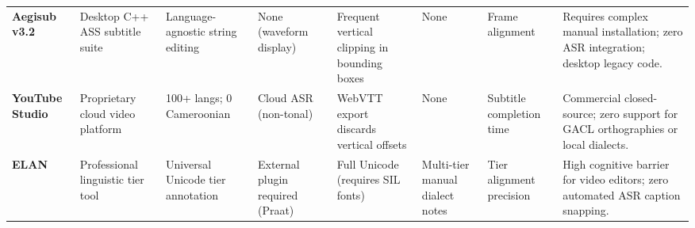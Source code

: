\documentclass[conference]{IEEEtran}
\begin{document}
\begin{table}[t]
\begin{tabular}{p{2.0cm} p{2.2cm} p{2.2cm} p{1.5cm} p{1.8cm} p{1.5cm} p{1.7cm} >{\raggedright\arraybackslash}p{3.2cm}}
\addlinespace
\textbf{Aegisub v3.2} & Desktop C++ ASS subtitle suite & Language-agnostic string editing & None (waveform display) & Frequent vertical clipping in bounding boxes & None & Frame alignment & Requires complex manual installation; zero ASR integration; desktop legacy code. \\
\addlinespace
\textbf{YouTube Studio} & Proprietary cloud video platform & 100+ langs; 0 Cameroonian & Cloud ASR (non-tonal) & WebVTT export discards vertical offsets & None & Subtitle completion time & Commercial closed-source; zero support for GACL orthographies or local dialects. \\
\addlinespace
\textbf{ELAN}~\cite{norman1986user} & Professional linguistic tier tool & Universal Unicode tier annotation & External plugin required (Praat) & Full Unicode (requires SIL fonts) & Multi-tier manual dialect notes & Tier alignment precision & High cognitive barrier for video editors; zero automated ASR caption snapping. \\
\bottomrule
\end{tabular}
\end{table}
\end{document}

